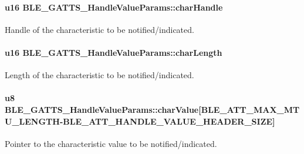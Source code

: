 \paragraph[{\texorpdfstring{char\+Handle}{charHandle}}]{\setlength{\rightskip}{0pt plus 5cm}u16 B\+L\+E\+\_\+\+G\+A\+T\+T\+S\+\_\+\+Handle\+Value\+Params\+::char\+Handle}\hypertarget{struct_b_l_e___g_a_t_t_s___handle_value_params_a74024c717d1cf91370ab5ac06f40bb48}{}\label{struct_b_l_e___g_a_t_t_s___handle_value_params_a74024c717d1cf91370ab5ac06f40bb48}
Handle of the characteristic to be notified/indicated. 
\paragraph[{\texorpdfstring{char\+Length}{charLength}}]{\setlength{\rightskip}{0pt plus 5cm}u16 B\+L\+E\+\_\+\+G\+A\+T\+T\+S\+\_\+\+Handle\+Value\+Params\+::char\+Length}\hypertarget{struct_b_l_e___g_a_t_t_s___handle_value_params_a2f45531812e6178458ba31958827fd7a}{}\label{struct_b_l_e___g_a_t_t_s___handle_value_params_a2f45531812e6178458ba31958827fd7a}
Length of the characteristic to be notified/indicated. 
\paragraph[{\texorpdfstring{char\+Value}{charValue}}]{\setlength{\rightskip}{0pt plus 5cm}u8 B\+L\+E\+\_\+\+G\+A\+T\+T\+S\+\_\+\+Handle\+Value\+Params\+::char\+Value\mbox{[}{\bf B\+L\+E\+\_\+\+A\+T\+T\+\_\+\+M\+A\+X\+\_\+\+M\+T\+U\+\_\+\+L\+E\+N\+G\+TH}-\/{\bf B\+L\+E\+\_\+\+A\+T\+T\+\_\+\+H\+A\+N\+D\+L\+E\+\_\+\+V\+A\+L\+U\+E\+\_\+\+H\+E\+A\+D\+E\+R\+\_\+\+S\+I\+ZE}\mbox{]}}\hypertarget{struct_b_l_e___g_a_t_t_s___handle_value_params_a89292fc9986fdda9f63f9d63d23838ec}{}\label{struct_b_l_e___g_a_t_t_s___handle_value_params_a89292fc9986fdda9f63f9d63d23838ec}
Pointer to the characteristic value to be notified/indicated. 
